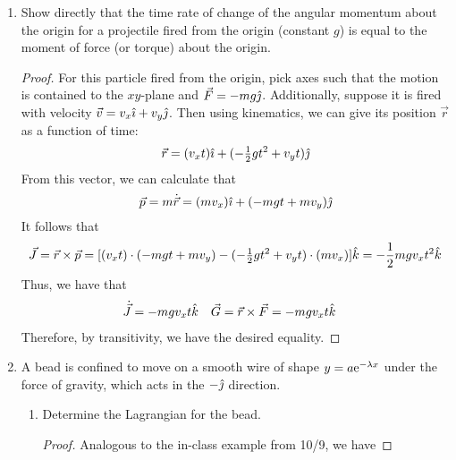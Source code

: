\documentclass[../psets.tex]{subfiles}
\begin{document}
\begin{enumerate}
\begin{proof}
\begin{align*}
            x_h &= \pm\frac{v_0}{2g}\sqrt{v_0^2-4gh}
        \end{align*}
        It follows that
        \begin{equation*}
            d = 2x_h = \frac{v_0}{g}\sqrt{v_0^2-4gh}
        \end{equation*}
        as desired.
    \end{proof}
    \item Show directly that the time rate of change of the angular momentum about the origin for a projectile fired from the origin (constant $g$) is equal to the moment of force (or torque) about the origin.
    \begin{proof}
        For this particle fired from the origin, pick axes such that the motion is contained to the $xy$-plane and $\vec{F}=-mg\jhat$. Additionally, suppose it is fired with velocity $\vec{v}=v_x\ihat+v_y\jhat$. Then using kinematics, we can give its position $\vec{r}$ as a function of time:
        \begin{equation*}
            \vec{r} = (v_xt)\ihat+(-\tfrac{1}{2}gt^2+v_yt)\jhat
        \end{equation*}
        From this vector, we can calculate that
        \begin{equation*}
            \vec{p} = m\dot{\vec{r}}
            = (mv_x)\ihat+(-mgt+mv_y)\jhat
        \end{equation*}
        It follows that
        \begin{equation*}
            \vec{J} = \vec{r}\times\vec{p}
            = [(v_xt)\cdot(-mgt+mv_y)-(-\tfrac{1}{2}gt^2+v_yt)\cdot(mv_x)]\khat
            = -\frac{1}{2}mgv_xt^2\khat
        \end{equation*}
        Thus, we have that
        \begin{align*}
            \dot{\vec{J}} &= -mgv_xt\khat&
            \vec{G} &= \vec{r}\times\vec{F}
                = -mgv_xt\khat
        \end{align*}
        Therefore, by transitivity, we have the desired equality.
    \end{proof}
    \item A bead is confined to move on a smooth wire of shape $y=a\e[-\lambda x]$ under the force of gravity, which acts in the $-\jhat$ direction.
    \begin{enumerate}
        \item Determine the Lagrangian for the bead.
        \begin{proof}
            Analogous to the in-class example from 10/9, we have

\end{proof}
\end{enumerate}
\end{enumerate}
\end{document}

